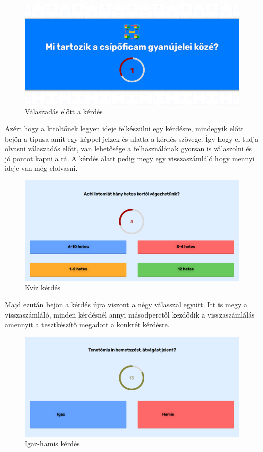 \begin{figure}[H]
    \centering
    \includegraphics[width=\linewidth]{images/question_type.png}
    \caption{Válaszadás előtt a kérdés}
\end{figure}

Azért hogy a kitöltőnek legyen ideje felkészülni egy kérdésre, mindegyik előtt bejön a típusa amit egy képpel jelzek és alatta a kérdés szövege. Így hogy el tudja olvasni válaszadás előtt, van lehetősége a felhasználónak gyorsan is válaszolni és jó pontot kapni a rá. A kérdés alatt pedig megy egy visszaszámláló hogy mennyi ideje van még elolvasni.

\begin{figure}[H]
    \centering
    \includegraphics[width=\linewidth]{images/question1.png}
    \caption{Kvíz kérdés}
\end{figure}

Majd ezután bejön a kérdés újra viszont a négy válasszal együtt. Itt is megy a visszaszámláló, minden kérdésnél annyi másodperctől kezdődik a visszaszámlálás amennyit a tesztkészítő megadott a konkrét kérdésre.

\begin{figure}[H]
    \centering
    \includegraphics[width=\linewidth]{images/question2.png}
    \caption{Igaz-hamis kérdés}
\end{figure}

